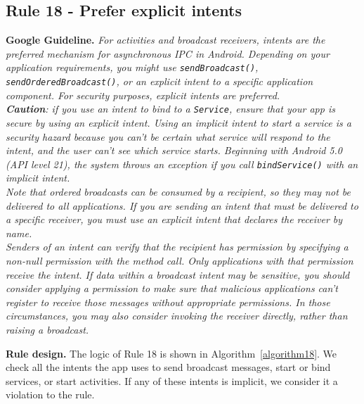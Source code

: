 \subsection{Rule 18 - Prefer explicit intents} 
\textbf{Google Guideline.} \emph{For activities and broadcast receivers, intents are the preferred mechanism for asynchronous IPC in Android. Depending on your application requirements, you might use \texttt{sendBroadcast()}, \texttt{sendOrderedBroadcast()}, or an explicit intent to a specific application component. For security purposes, explicit intents are preferred.
\\
\textbf{Caution}: if you use an intent to bind to a \texttt{Service}, ensure that your app is secure by using an \textit{explicit} intent. Using an implicit intent to start a service is a security hazard because you can't be certain what service will respond to the intent, and the user can't see which service starts. Beginning with Android 5.0 (API level 21), the system throws an exception if you call \texttt{bindService()} with an implicit intent.
\\
Note that ordered broadcasts can be \textit{consumed} by a recipient, so they may not be delivered to all applications. If you are sending an intent that must be delivered to a specific receiver, you must use an explicit intent that declares the receiver by name.
\\
Senders of an intent can verify that the recipient has permission by specifying a non-null permission with the method call. Only applications with that permission receive the intent. If data within a broadcast intent may be sensitive, you should consider applying a permission to make sure that malicious applications can't register to receive those messages without appropriate permissions. In those circumstances, you may also consider invoking the receiver directly, rather than raising a broadcast.}

\textbf{Rule design.} The logic of Rule 18 is shown in Algorithm~\ref{algorithm18}. 
We check all the intents the app uses to send broadcast messages, start or bind services, or start activities. If any of these intents is implicit, we consider it a violation to the rule. 

\begin{algorithm}[]
\SetAlgoLined
{}
\caption{}
\label{algorithm18}
\end{algorithm}

